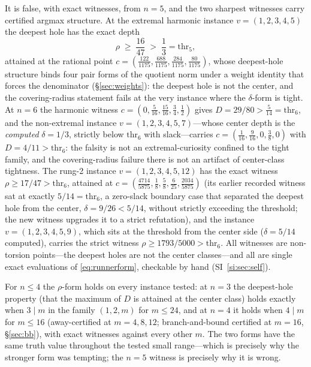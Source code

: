 \documentclass[11pt,a4paper]{article}
\numberwithin{equation}{section}
\theoremstyle{plain}
\theoremstyle{definition}
\theoremstyle{remark}
\begin{document}
It is false, with exact witnesses, from $n=5$, and the two sharpest
witnesses carry certified argmax structure. At the extremal harmonic
instance $v=(1,2,3,4,5)$ the deepest hole has the exact depth
\[
\rho\;\ge\;\frac{16}{47}\;>\;\frac13=\mathrm{thr}_5,
\]
attained at the rational point
$c=(\tfrac{122}{1175},\tfrac{688}{1175},\tfrac{284}{1175},
\tfrac{80}{1175})$, whose deepest-hole structure binds four pair forms
of the quotient norm under a weight identity that forces the denominator
(\S\ref{sec:weights}): the deepest hole is not the center, and the
covering-radius statement fails at the very instance where the
$\delta$-form is tight. At $n=6$ the harmonic witness
$c=(0,\tfrac5{16},\tfrac{15}{16},\tfrac34,\tfrac12)$ gives
$D=29/80>\tfrac5{14}=\mathrm{thr}_6$, and the non-extremal instance
$v=(1,2,3,4,5,7)$---whose center depth is the \emph{computed}
$\delta=1/3$, strictly below $\mathrm{thr}_6$ with slack---carries
$c=(\tfrac1{16},\tfrac9{16},0,\tfrac38,0)$
with $D=4/11>\mathrm{thr}_6$: the falsity is not an extremal-curiosity
confined to the tight family, and the covering-radius failure there is
not an artifact of center-class tightness. The rung-2 instance
$v=(1,2,3,4,5,12)$ has the exact witness $\rho\ge17/47>\mathrm{thr}_6$,
attained at
$c=(\tfrac{4714}{5875},\tfrac18,\tfrac58,\tfrac6{25},
\tfrac{2034}{5875})$ (its earlier recorded witness sat at exactly
$5/14=\mathrm{thr}_6$, a zero-slack boundary case that separated the
deepest hole from the center, $\delta=9/26<5/14$, without strictly
exceeding the threshold; the new witness upgrades it to a strict
refutation), and the instance $v=(1,2,3,4,5,9)$, which sits at the
threshold from the center side ($\delta=5/14$ computed), carries the
strict witness $\rho\ge 1793/5000>\mathrm{thr}_6$. All witnesses are
non-torsion points---the deepest holes are
not the center classes---and all are single exact evaluations of
\eqref{eq:runnerform}, checkable by hand (SI~\ref{si:sec:self}).

For $n\le4$ the $\rho$-form holds on every instance tested: at $n=3$
the deepest-hole property (that the maximum of $D$ is attained at the
center class) holds exactly when $3\mid m$ in the family
$(1,2,m)$ for $m\le24$, and at $n=4$ it holds when $4\mid m$ for
$m\le16$ (away-certified at $m=4,8,12$; branch-and-bound certified at
$m=16$, \S\ref{sec:bb}), with exact witnesses against every other $m$.
The two forms have the same truth value throughout the tested small
range---which is precisely why the stronger form was tempting; the
$n=5$ witness is precisely why it is wrong.
\end{document}
